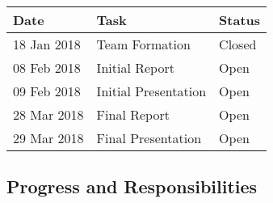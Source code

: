 \documentclass{article}
\begin{document}
\begin{center}
\begin{tabular}{|p{3cm}p{3cm}p{3cm}|}

\hline
\textbf{Date} & \textbf{Task} & \textbf{Status} \\
\hline
18 Jan 2018 & Team Formation & Closed \\
08 Feb 2018 & Initial Report & Open \\
09 Feb 2018 & Initial Presentation &Open \\
28 Mar 2018 & Final Report & Open \\
29 Mar 2018	& Final Presentation & Open \\
\hline

\end{tabular}
\end{center}

\subsection{Progress and Responsibilities}
\end{document}
